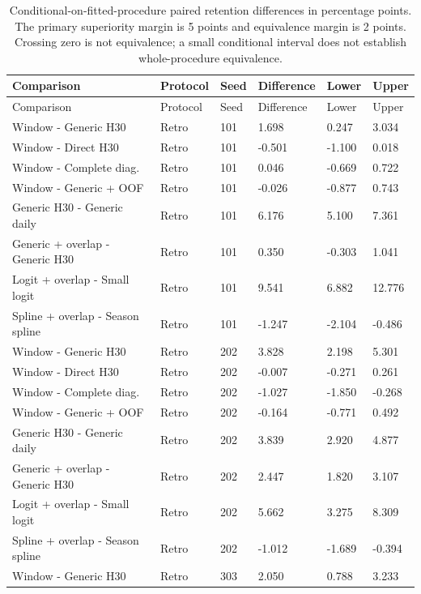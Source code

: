{\tabletext
\setlength{\tabcolsep}{3pt}
\begin{longtable}{p{}p{}p{}p{}p{}p{}}
\caption{Conditional-on-fitted-procedure paired retention differences in percentage points. The primary superiority margin is 5 points and equivalence margin is 2 points. Crossing zero is not equivalence; a small conditional interval does not establish whole-procedure equivalence.}\label{tab:r3si-conditional_contrasts}\\
\toprule
Comparison & Protocol & Seed & Difference & Lower & Upper \\
\midrule
\endfirsthead
\toprule
Comparison & Protocol & Seed & Difference & Lower & Upper \\
\midrule
\endhead
Window - Generic H30 & Retro & 101 & 1.698 & 0.247 & 3.034 \\
Window - Direct H30 & Retro & 101 & -0.501 & -1.100 & 0.018 \\
Window - Complete diag. & Retro & 101 & 0.046 & -0.669 & 0.722 \\
Window - Generic + OOF & Retro & 101 & -0.026 & -0.877 & 0.743 \\
Generic H30 - Generic daily & Retro & 101 & 6.176 & 5.100 & 7.361 \\
Generic + overlap - Generic H30 & Retro & 101 & 0.350 & -0.303 & 1.041 \\
Logit + overlap - Small logit & Retro & 101 & 9.541 & 6.882 & 12.776 \\
Spline + overlap - Season spline & Retro & 101 & -1.247 & -2.104 & -0.486 \\
Window - Generic H30 & Retro & 202 & 3.828 & 2.198 & 5.301 \\
Window - Direct H30 & Retro & 202 & -0.007 & -0.271 & 0.261 \\
Window - Complete diag. & Retro & 202 & -1.027 & -1.850 & -0.268 \\
Window - Generic + OOF & Retro & 202 & -0.164 & -0.771 & 0.492 \\
Generic H30 - Generic daily & Retro & 202 & 3.839 & 2.920 & 4.877 \\
Generic + overlap - Generic H30 & Retro & 202 & 2.447 & 1.820 & 3.107 \\
Logit + overlap - Small logit & Retro & 202 & 5.662 & 3.275 & 8.309 \\
Spline + overlap - Season spline & Retro & 202 & -1.012 & -1.689 & -0.394 \\
Window - Generic H30 & Retro & 303 & 2.050 & 0.788 & 3.233 \\

\end{longtable}}
